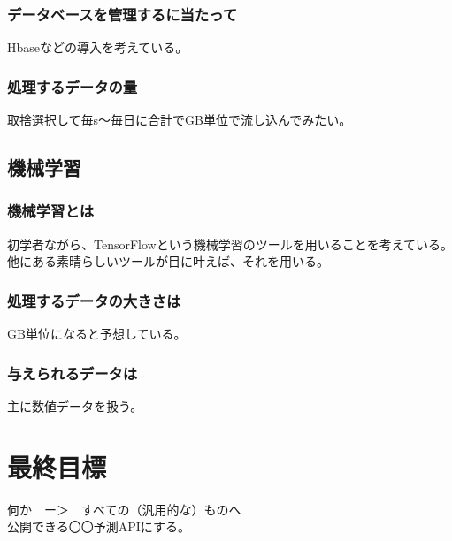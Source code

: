 \documentclass{scrartcl}
\begin{document}
\subsubsection{データベースを管理するに当たって}
\label{sec:org715c7b5}
Hbaseなどの導入を考えている。\\
\subsubsection{処理するデータの量}
\label{sec:org07b3855}
取捨選択して毎s〜毎日に合計でGB単位で流し込んでみたい。\\
\subsection{機械学習}
\label{sec:org0a80128}
\subsubsection{機械学習とは}
\label{sec:org92e0ebb}
初学者ながら、TensorFlowという機械学習のツールを用いることを考えている。他にある素晴らしいツールが目に叶えば、それを用いる。\\
\subsubsection{処理するデータの大きさは}
\label{sec:org1999783}
GB単位になると予想している。\\
\subsubsection{与えられるデータは}
\label{sec:org6b7f938}
主に数値データを扱う。\\
\section{最終目標}
\label{sec:org1c0e587}
何か　ー＞　すべての（汎用的な）ものへ\\
公開できる〇〇予測APIにする。\\
\end{document}
